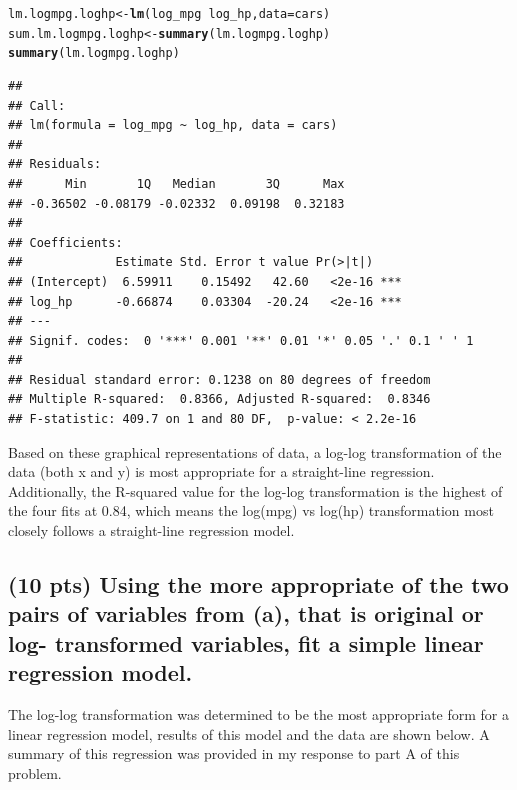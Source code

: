 \documentclass{article}\usepackage[]{graphicx}\usepackage[]{color}
\makeatletter
\newcommand{\hlopt}[1]{\textcolor[rgb]{0,0,0}{#1}}%
\newcommand{\hlstd}[1]{\textcolor[rgb]{0.345,0.345,0.345}{#1}}%
\newcommand{\hlkwb}[1]{\textcolor[rgb]{0.69,0.353,0.396}{#1}}%
\newcommand{\hlkwc}[1]{\textcolor[rgb]{0.333,0.667,0.333}{#1}}%
\newcommand{\hlkwd}[1]{\textcolor[rgb]{0.737,0.353,0.396}{\textbf{#1}}}%
\newenvironment{kframe}{%
 \def\at@end@of@kframe{}%
 \ifinner\ifhmode%
  \def\at@end@of@kframe{\end{minipage}}%
  \begin{minipage}{\columnwidth}%
 \fi\fi%
 \def\FrameCommand##1{\hskip\@totalleftmargin \hskip-\fboxsep
 \colorbox{shadecolor}{##1}\hskip-\fboxsep
     \hskip-\linewidth \hskip-\@totalleftmargin \hskip\columnwidth}%
 \MakeFramed {\advance\hsize-\width
   \@totalleftmargin\z@ \linewidth\hsize
   \@setminipage}}%
 {\par\unskip\endMakeFramed%
 \at@end@of@kframe}
\newenvironment{knitrout}{}{} %
\makeatother
\begin{document}
\begin{knitrout}
\begin{kframe}\begin{alltt}
\hlstd{lm.logmpg.loghp} \hlkwb{<-} \hlkwd{lm}\hlstd{(log_mpg} \hlopt{~} \hlstd{log_hp,} \hlkwc{data} \hlstd{= cars)}
\hlstd{sum.lm.logmpg.loghp} \hlkwb{<-} \hlkwd{summary}\hlstd{(lm.logmpg.loghp)}
\hlkwd{summary}\hlstd{(lm.logmpg.loghp)}
\end{alltt}
\begin{verbatim}
## 
## Call:
## lm(formula = log_mpg ~ log_hp, data = cars)
## 
## Residuals:
##      Min       1Q   Median       3Q      Max 
## -0.36502 -0.08179 -0.02332  0.09198  0.32183 
## 
## Coefficients:
##             Estimate Std. Error t value Pr(>|t|)    
## (Intercept)  6.59911    0.15492   42.60   <2e-16 ***
## log_hp      -0.66874    0.03304  -20.24   <2e-16 ***
## ---
## Signif. codes:  0 '***' 0.001 '**' 0.01 '*' 0.05 '.' 0.1 ' ' 1
## 
## Residual standard error: 0.1238 on 80 degrees of freedom
## Multiple R-squared:  0.8366,	Adjusted R-squared:  0.8346 
## F-statistic: 409.7 on 1 and 80 DF,  p-value: < 2.2e-16
\end{verbatim}
\end{kframe}
\end{knitrout}

Based on these graphical representations of data, a log-log transformation of the data (both
x and y) is most appropriate for a straight-line regression.  Additionally, the R-squared value for the log-log transformation is the highest of the four fits at 0.84, which means the log(mpg) vs log(hp) transformation most closely follows a straight-line regression model.

\subsection{(10 pts) Using the more appropriate of the two pairs of variables from (a), that is original or log-
transformed variables, fit a simple linear regression model.}

The log-log transformation was determined to be the most appropriate form for a linear regression model, results of this model and the data are shown below.  A summary of this regression was provided in my response to part A of this problem.
\end{document}
